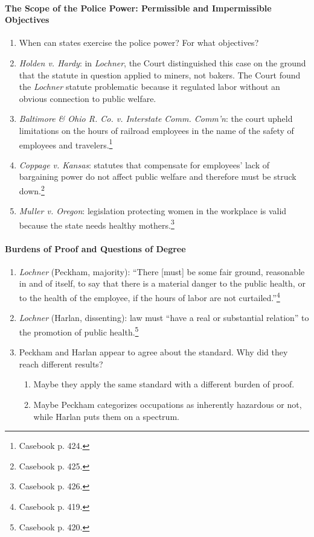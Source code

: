 \paragraph{The Scope of the Police Power: Permissible and Impermissible 
Objectives}

\begin{enumerate}
    \item When can states exercise the police power? For what objectives?
    \item \emph{Holden v. Hardy}: in \emph{Lochner}, the Court distinguished 
    this case on the ground that the statute in question applied to miners, 
    not bakers. The Court found the \emph{Lochner} statute problematic 
    because it regulated labor without an obvious connection to public 
    welfare.
    \item \emph{Baltimore \& Ohio R. Co. v. Interstate Comm. Comm'n}: the 
    court upheld limitations on the hours of railroad employees in the name of 
    the safety of employees and travelers.\footnote{Casebook p. 424.}
    \item \emph{Coppage v. Kansas}: statutes that compensate for employees' 
    lack of bargaining power do not affect public welfare and therefore must 
    be struck down.\footnote{Casebook p. 425.}
    \item \emph{Muller v. Oregon}: legislation protecting women in the 
    workplace is valid because the state needs healthy 
    mothers.\footnote{Casebook p. 426.}
\end{enumerate}

\paragraph{Burdens of Proof and Questions of Degree}

\begin{enumerate}
    \item \emph{Lochner} (Peckham, majority): ``There [must] be some fair 
    ground, reasonable in and of itself, to say that there is a material 
    danger to the public health, or to the health of the employee, if the 
    hours of labor are not curtailed.''\footnote{Casebook p. 419.}
    \item \emph{Lochner} (Harlan, dissenting): law must ``have a real or 
    substantial relation'' to the promotion of public 
    health.\footnote{Casebook p. 420.}
    \item Peckham and Harlan appear to agree about the standard. Why did they 
    reach different results?
    \begin{enumerate}
        \item Maybe they apply the same standard with a different burden of 
        proof.
        \item Maybe Peckham categorizes occupations as inherently hazardous or 
        not, while Harlan puts them on a spectrum.
    \end{enumerate}
\end{enumerate}

